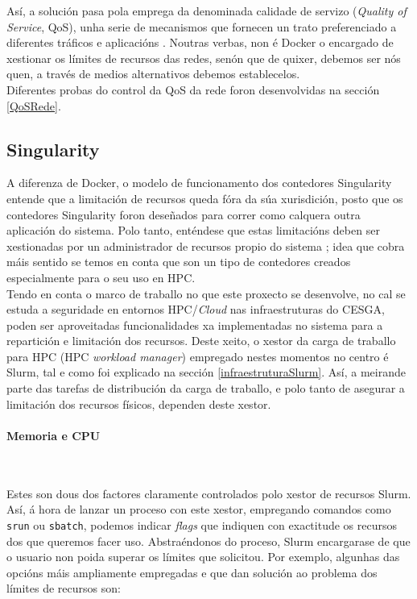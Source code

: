 Así, a solución pasa pola emprega da denominada calidade de servizo (\textit{Quality of Service}, QoS), unha serie de mecanismos que fornecen un trato preferenciado a diferentes tráficos e aplicacións \cite{dockerQoS}. Noutras verbas, non é Docker o encargado de xestionar os límites de recursos das redes, senón que de quixer, debemos ser nós quen, a través de medios alternativos debemos establecelos.\\

Diferentes probas do control da QoS da rede foron desenvolvidas na sección \ref{QoSRede}.

\subsection{Singularity}

A diferenza de Docker, o modelo de funcionamento dos contedores Singularity entende que a limitación de recursos queda fóra da súa xurisdición, posto que os contedores Singularity foron deseñados para correr como calquera outra aplicación do sistema. Polo tanto, enténdese que estas limitacións deben ser xestionadas por un administrador de recursos propio do sistema \cite{singularity-limits}; idea que cobra máis sentido se temos en conta que son un tipo de contedores creados especialmente para o seu uso en HPC.\\

Tendo en conta o marco de traballo no que este proxecto se desenvolve, no cal se estuda a seguridade en entornos HPC/\textit{Cloud} nas infraestruturas do CESGA, poden ser aproveitadas funcionalidades xa implementadas no sistema para a repartición e limitación dos recursos. Deste xeito, o xestor da carga de traballo para HPC (HPC \textit{workload manager}) empregado nestes momentos no centro é Slurm, tal e como foi explicado na sección \ref{infraestruturaSlurm}. Así, a meirande parte das tarefas de distribución da carga de traballo, e polo tanto de asegurar a limitación dos recursos físicos, dependen deste xestor.

\paragraph{Memoria e CPU}~

Estes son dous dos factores claramente controlados polo xestor de recursos Slurm. Así, á hora de lanzar un proceso con este xestor, empregando comandos como {\tt srun} ou {\tt sbatch}, podemos indicar \textit{flags} que indiquen con exactitude os recursos dos que queremos facer uso. Abstraéndonos do proceso, Slurm encargarase de que o usuario non poida superar os límites que solicitou. Por exemplo, algunhas das opcións máis ampliamente empregadas e que dan solución ao problema dos límites de recursos son:

